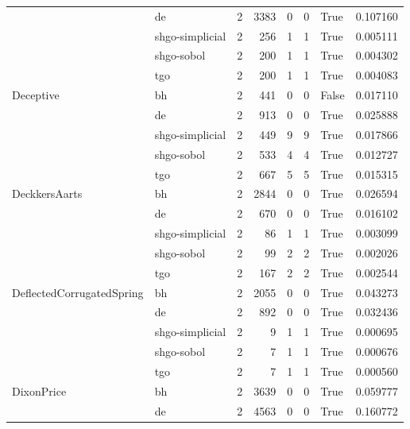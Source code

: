 \begin{longtable}{llrrrrlr}
         & de &     2 &     3383 &      0 &       0 &    True &    0.107160 \\
         & shgo-simplicial &     2 &      256 &      1 &       1 &    True &    0.005111 \\
         & shgo-sobol &     2 &      200 &      1 &       1 &    True &    0.004302 \\
         & tgo &     2 &      200 &      1 &       1 &    True &    0.004083 \\
Deceptive & bh &     2 &      441 &      0 &       0 &   False &    0.017110 \\
         & de &     2 &      913 &      0 &       0 &    True &    0.025888 \\
         & shgo-simplicial &     2 &      449 &      9 &       9 &    True &    0.017866 \\
         & shgo-sobol &     2 &      533 &      4 &       4 &    True &    0.012727 \\
         & tgo &     2 &      667 &      5 &       5 &    True &    0.015315 \\
DeckkersAarts & bh &     2 &     2844 &      0 &       0 &    True &    0.026594 \\
         & de &     2 &      670 &      0 &       0 &    True &    0.016102 \\
         & shgo-simplicial &     2 &       86 &      1 &       1 &    True &    0.003099 \\
         & shgo-sobol &     2 &       99 &      2 &       2 &    True &    0.002026 \\
         & tgo &     2 &      167 &      2 &       2 &    True &    0.002544 \\
DeflectedCorrugatedSpring & bh &     2 &     2055 &      0 &       0 &    True &    0.043273 \\
         & de &     2 &      892 &      0 &       0 &    True &    0.032436 \\
         & shgo-simplicial &     2 &        9 &      1 &       1 &    True &    0.000695 \\
         & shgo-sobol &     2 &        7 &      1 &       1 &    True &    0.000676 \\
         & tgo &     2 &        7 &      1 &       1 &    True &    0.000560 \\
DixonPrice & bh &     2 &     3639 &      0 &       0 &    True &    0.059777 \\
         & de &     2 &     4563 &      0 &       0 &    True &    0.160772 \\

\end{longtable}
